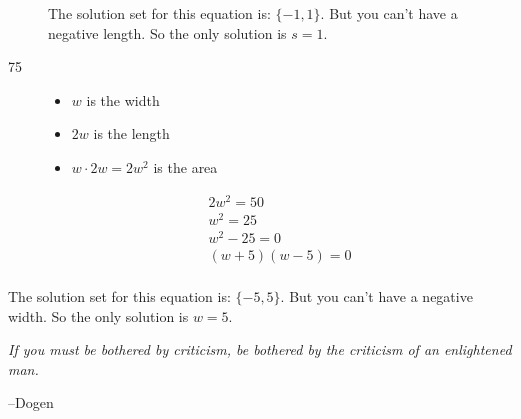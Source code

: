 \documentclass[fleqn,addpoints]{exam}
\begin{document}
\begin{description}
The solution set for this equation is: $\{-1, 1\}$.  But you can't have a negative length.  So the only
solution is $s = 1$.




\item[75] 
\begin{itemize}
  \item $w$ is the width
  \item $2w$ is the length
  \item $w \cdot 2w = 2w^2$ is the area
\end{itemize}

\begin{align*}
  2w^2 = 50 \\
  w^2 = 25 \\
  w^2 - 25 = 0 \\
  (w + 5)(w - 5) = 0 \\
\end{align*}
\end{description}

The solution set for this equation is: $\{-5, 5\}$.  But you can't have a negative width.  So the only
solution is $w = 5$.

\else
\vspace{5 in}

{\em If you must be bothered by criticism, be bothered by the criticism of an enlightened man.}

\vspace{.2 cm}
\hspace{1 cm} --Dogen

\fi
\end{document}
